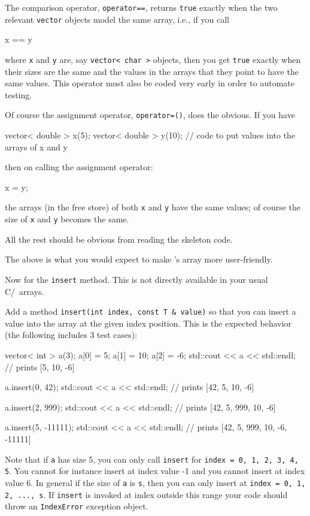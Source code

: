 The comparison operator, \verb!operator==!, returns \verb!true!
exactly when the two relevant \verb!vector! objects
model the same array, i.e., if you call
\begin{console}[fontsize=\footnotesize]
x == y
\end{console}
where \verb!x! and \verb!y! are, say \verb!vector< char >! objects,
then you get \verb!true! 
exactly when their sizes are the same and the values in the arrays
that they point to have the same values.
This operator must also be coded very early in order to 
automate testing. 

Of course the assignment operator, \verb!operator=()!, does the obvious.
If you have
\begin{console}[fontsize=\footnotesize]
vector< double > x(5);
vector< double > y(10);
// code to put values into the arrays of x and y
\end{console}
then on calling the assignment operator:
\begin{console}[fontsize=\footnotesize]
x = y;
\end{console}
the arrays (in the free store) of both \verb!x! and \verb!y!
have the same values; of course the size of \verb!x! and \verb!y!
becomes the same.

All the rest should be obvious from reading the skeleton code.

The above is what you would expect to make \cpp's array more
user-friendly.

Now for the \verb!insert! method.
This is not directly available in your usual C/\cpp\ arrays.

Add a method \verb!insert(int index, const T & value)! so that 
you can insert a 
value into
the array at the given index position. 
This is the expected behavior (the following includes 3 test cases):
\begin{console}[fontsize=\footnotesize]
vector< int > a(3);
a[0] = 5;
a[1] = 10;
a[2] = -6;
std::cout << a << std::endl; // prints [5, 10, -6]

a.insert(0, 42);
std::cout << a << std::endl; // prints [42, 5, 10, -6]

a.insert(2, 999);
std::cout << a << std::endl; // prints [42, 5, 999, 10, -6]

a.insert(5, -11111);
std::cout << a << std::endl; // prints [42, 5, 999, 10, -6, -11111]
\end{console}

Note that if \verb!a! has size 5, you can only call \verb!insert!
for \verb!index = 0, 1, 2, 3, 4, 5!.
You cannot for instance insert at index value -1 and you cannot insert at
index value 6.
In general if the size of \verb!a! is \verb!s!, then you can 
only insert at \verb!index = 0, 1, 2, ..., s!.
If \verb!insert! is invoked at index outside this range your code
should throw an \verb!IndexError! exception object.

